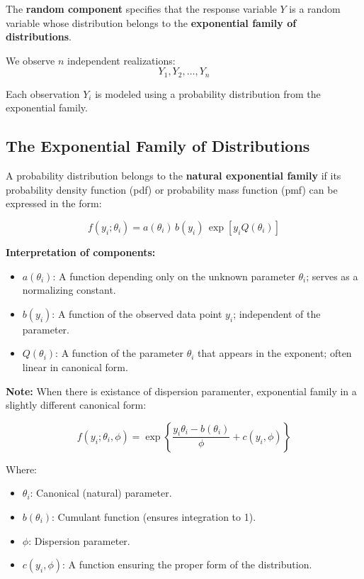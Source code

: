 \documentclass[12pt,a4paper]{article}
\begin{document}
\begin{definition}
The \textbf{random component} specifies that the response variable \( Y \) is a random variable whose distribution belongs to the \textbf{exponential family of distributions}.

We observe \( n \) independent realizations:
\[
Y_1, Y_2, \dots, Y_n
\]

Each observation \( Y_i \) is modeled using a probability distribution from the exponential family.

\end{definition}

\subsection*{The Exponential Family of Distributions}

A probability distribution belongs to the \textbf{natural exponential family} if its probability density function (pdf) or probability mass function (pmf) can be expressed in the form:

\[
f(y_i; \theta_i) = a(\theta_i)\, b(y_i)\, \exp\left[y_i Q(\theta_i)\right]
\]

\textbf{Interpretation of components:}

\begin{itemize}
  \item \( a(\theta_i) \): A function depending only on the unknown parameter \( \theta_i \); serves as a normalizing constant.
  \item \( b(y_i) \): A function of the observed data point \( y_i \); independent of the parameter.
  \item \( Q(\theta_i) \): A function of the parameter \( \theta_i \) that appears in the exponent; often linear in canonical form.
\end{itemize}

\textbf{Note:} When there is existance of dispersion paramenter, exponential family in a slightly different canonical form:

\[
f(y_i; \theta_i, \phi) = \exp\left\{ \frac{y_i \theta_i - b(\theta_i)}{\phi} + c(y_i, \phi) \right\}
\]

Where:
\begin{itemize}
  \item \( \theta_i \): Canonical (natural) parameter.
  \item \( b(\theta_i) \): Cumulant function (ensures integration to 1).
  \item \( \phi \): Dispersion parameter.
  \item \( c(y_i, \phi) \): A function ensuring the proper form of the distribution.
\end{itemize}
\end{document}
